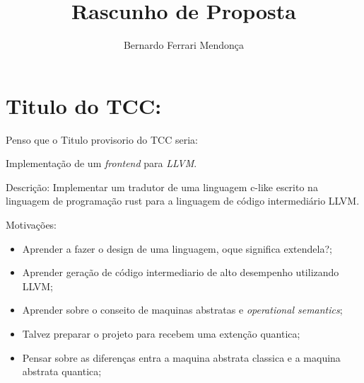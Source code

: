 \documentclass[12pt]{article}
\author{Bernardo Ferrari Mendonça}
\title{Rascunho de Proposta}
\begin{document}
\section{Titulo do TCC:}

Penso que o Titulo provisorio do TCC seria:

\begin{center}
Implementação de um \textit{frontend} para \textit{LLVM}.
\end{center}

Descrição: Implementar um tradutor de uma linguagem c-like escrito na linguagem de programação rust para a linguagem de código intermediário LLVM\@.

Motivações:
\begin{itemize}
  \item Aprender a fazer o design de uma linguagem, oque significa extendela?;
  \item Aprender geração de código intermediario de alto desempenho utilizando LLVM\@;
  \item Aprender sobre o conseito de maquinas abstratas e \textit{operational semantics};
  \item Talvez preparar o projeto para recebem uma extenção quantica;
  \item Pensar sobre as diferenças entra a maquina abstrata classica e a maquina abstrata quantica;
\end{itemize}
\end{document}
